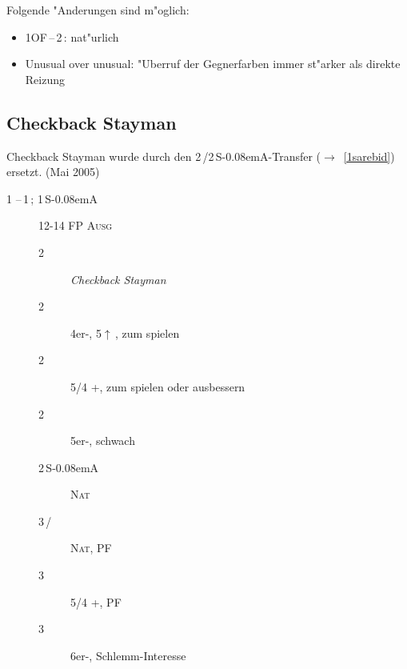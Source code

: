 \documentclass[11pt,german,twocolumn]{scrartcl}
\def\pik{\nobreak\,\Sp\xspace}
\def\coe{\nobreak\,\He\xspace}
\def\kar{\nobreak\,\Di\xspace}
\def\tre{\nobreak\,\Cl\xspace}
\def\pi{\Sp\xspace}
\def\co{\He\xspace}
\def\mi{\,\Cl /\Di\xspace}
\def\ra{$\rightarrow$\xspace}
\def\pl{$\uparrow$\xspace}
\def\ofa{\nobreak\textsf{OF}\xspace}
\def\sa{\nobreak\textsf{S\kern-0.08emA}\xspace}
\def\SA{\nobreak\,\sa}
\def\sep{\,--\,}
\newcommand{\conv}[1]{\emph{#1}}
\def\bal{\textsc{Ausg}\xspace}
\def\nat{\textsc{Nat}\xspace}
\def\pf{\textsc{PF}\xspace}
\def\bdsc{\begin{description}}
\def\edsc{\end{description}}
\begin{document}
\begin{appendix}
Folgende "Anderungen sind m"oglich:
%
\begin{itemize}
\item 1\ofa{}\sep2\tre: nat"urlich
\item Unusual over unusual: "Uberruf der Gegnerfarben immer st"arker als direkte Reizung
\end{itemize}

\subsection{Checkback Stayman}

Checkback Stayman wurde durch den 2\tre/2\SA-Transfer (\ra~\ref{1sarebid})
ersetzt. (Mai 2005)

\bdsc
\item[1\tre{}\sep1\pik; 1\SA] 12-14 FP \bal
  \bdsc
  \item[2\tre] \conv{Checkback Stayman}
  \item[2\kar] 4er-\pi, 5\pl{}\kar, zum spielen
  \item[2\coe] 5/4 \pi{}+\co, zum spielen oder ausbessern
  \item[2\pik] 5er-\pi, schwach
  \item[2\SA] \nat
  \item[3\mi] \nat, \pf
  \item[3\coe] 5/4 \pi{}+\co, \pf
  \item[3\pik] 6er-\pi, Schlemm-Interesse
  \edsc
\edsc
\end{appendix}
\printindex
\end{document}
